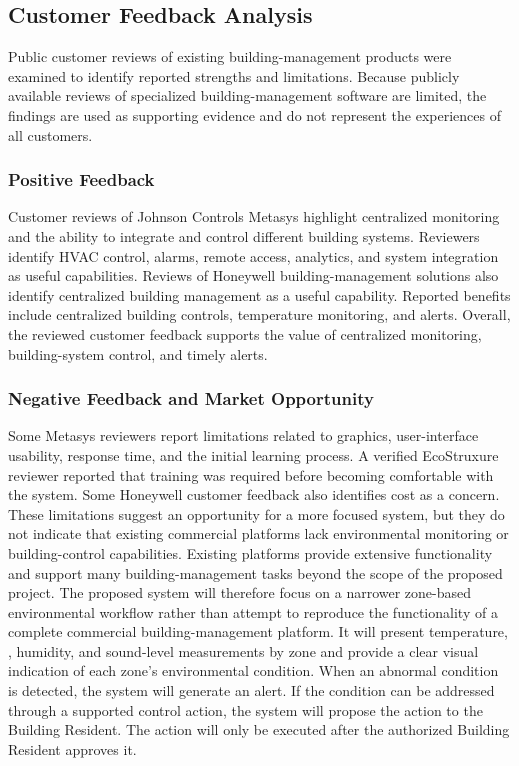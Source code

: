 \documentclass[11pt,a4paper]{article}
\begin{document}
\subsection{Customer Feedback Analysis}
Public customer reviews of existing building-management products were examined to identify reported strengths and limitations. Because publicly available reviews of specialized building-management software are limited, the findings are used as supporting evidence and do not represent the experiences of all customers.

\subsubsection{Positive Feedback}
Customer reviews of Johnson Controls Metasys highlight centralized monitoring and the ability to integrate and control different building systems. Reviewers identify HVAC control, alarms, remote access, analytics, and system integration as useful capabilities. Reviews of Honeywell building-management solutions also identify centralized building management as a useful capability. Reported benefits include centralized building controls, temperature monitoring, and alerts. Overall, the reviewed customer feedback supports the value of centralized monitoring, building-system control, and timely alerts.

\subsubsection{Negative Feedback and Market Opportunity}
Some Metasys reviewers report limitations related to graphics, user-interface usability, response time, and the initial learning process. A verified EcoStruxure reviewer reported that training was required before becoming comfortable with the system. Some Honeywell customer feedback also identifies cost as a concern. These limitations suggest an opportunity for a more focused system, but they do not indicate that existing commercial platforms lack environmental monitoring or building-control capabilities. Existing platforms provide extensive functionality and support many building-management tasks beyond the scope of the proposed project. The proposed system will therefore focus on a narrower zone-based environmental workflow rather than attempt to reproduce the functionality of a complete commercial building-management platform. It will present temperature, \COtwo, humidity, and sound-level measurements by zone and provide a clear visual indication of each zone's environmental condition. When an abnormal condition is detected, the system will generate an alert. If the condition can be addressed through a supported control action, the system will propose the action to the Building Resident. The action will only be executed after the authorized Building Resident approves it.
\end{document}
